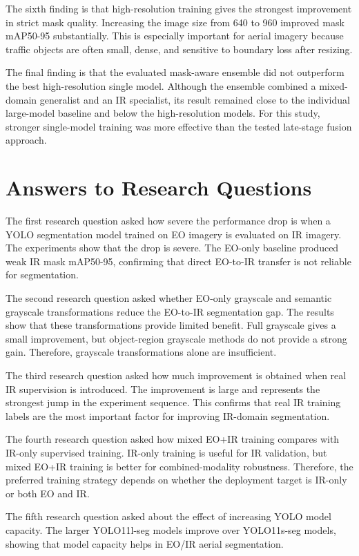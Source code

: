 The sixth finding is that high-resolution training gives the strongest improvement in strict mask quality. Increasing the image size from 640 to 960 improved mask mAP50-95 substantially. This is especially important for aerial imagery because traffic objects are often small, dense, and sensitive to boundary loss after resizing.

The final finding is that the evaluated mask-aware ensemble did not outperform the best high-resolution single model. Although the ensemble combined a mixed-domain generalist and an IR specialist, its result remained close to the individual large-model baseline and below the high-resolution models. For this study, stronger single-model training was more effective than the tested late-stage fusion approach.

\section{Answers to Research Questions}

The first research question asked how severe the performance drop is when a YOLO segmentation model trained on EO imagery is evaluated on IR imagery. The experiments show that the drop is severe. The EO-only baseline produced weak IR mask mAP50-95, confirming that direct EO-to-IR transfer is not reliable for segmentation.

The second research question asked whether EO-only grayscale and semantic grayscale transformations reduce the EO-to-IR segmentation gap. The results show that these transformations provide limited benefit. Full grayscale gives a small improvement, but object-region grayscale methods do not provide a strong gain. Therefore, grayscale transformations alone are insufficient.

The third research question asked how much improvement is obtained when real IR supervision is introduced. The improvement is large and represents the strongest jump in the experiment sequence. This confirms that real IR training labels are the most important factor for improving IR-domain segmentation.

The fourth research question asked how mixed EO+IR training compares with IR-only supervised training. IR-only training is useful for IR validation, but mixed EO+IR training is better for combined-modality robustness. Therefore, the preferred training strategy depends on whether the deployment target is IR-only or both EO and IR.

The fifth research question asked about the effect of increasing YOLO model capacity. The larger YOLO11l-seg models improve over YOLO11s-seg models, showing that model capacity helps in EO/IR aerial segmentation.

